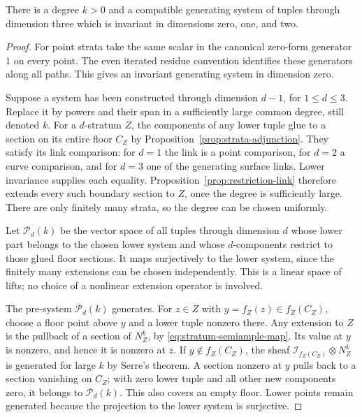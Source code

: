 \begin{proposition}\label{prop:generating-tuples}
There is a degree \(k>0\) and a compatible generating system of tuples
through dimension three which is invariant in dimensions zero, one, and
two.
\end{proposition}
\begin{proof}
For point strata take the same scalar in the canonical zero-form generator
\(1\) on every point.  The even iterated residue convention identifies
these generators along all paths.  This gives an invariant generating
system in dimension zero.

Suppose a system has been constructed through dimension \(d-1\), for
\(1\leq d\leq3\).  Replace it by powers and their span in a sufficiently
large common degree, still denoted \(k\).  For a \(d\)-stratum \(Z\),
the components of any lower tuple glue to a section on its entire floor
\(C_Z\) by Proposition~\ref{prop:strata-adjunction}.  They satisfy its
link comparison: for \(d=1\) the link is a point comparison, for \(d=2\)
a curve comparison, and for \(d=3\) one of the generating surface links.
Lower invariance supplies each equality.  Proposition~\ref{prop:restriction-link}
therefore extends every such boundary section to \(Z\), once the degree
is sufficiently large.  There are only finitely many strata, so the degree
can be chosen uniformly.

Let \(\mathcal P_d(k)\) be the vector space of all tuples through
dimension \(d\) whose lower part belongs to the chosen lower system and
whose \(d\)-components restrict to those glued floor sections.  It maps
surjectively to the lower system, since the finitely many extensions can
be chosen independently.  This is a linear space of lifts; no choice of
a nonlinear extension operator is involved.

The pre-system \(\mathcal P_d(k)\) generates.  For \(z\in Z\) with
\(y=f_Z(z)\in f_Z(C_Z)\), choose a floor point above \(y\) and a lower
tuple nonzero there.  Any extension to \(Z\) is the pullback of a section
of \(N_Z^k\), by \eqref{eq:stratum-semiample-map}.  Its value at \(y\)
is nonzero, and hence it is nonzero at \(z\).  If \(y\notin f_Z(C_Z)\),
the sheaf \(\mathscr I_{f_Z(C_Z)}\otimes N_Z^k\) is generated for large
\(k\) by Serre's theorem.  A section nonzero at \(y\) pulls back to a
section vanishing on \(C_Z\); with zero lower tuple and all other new
components zero, it belongs to \(\mathcal P_d(k)\).  This also covers an
empty floor.  Lower points remain generated because the projection to
the lower system is surjective.


\end{proof}
